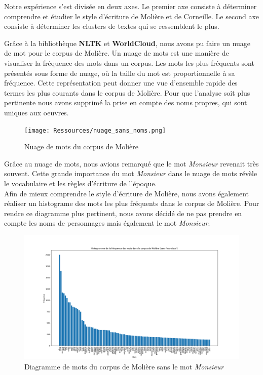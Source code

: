 \vspace{\baselineskip}

\hspace{0,5cm}Notre expérience s'est divisée en deux axes. Le premier axe
consiste à déterminer comprendre et étudier le style d'écriture de Molière et de
Corneille. Le second axe consiste à déterminer les clusters de textes qui se
ressemblent le plus.

\hspace{0,5cm}Grâce à la bibliothèque \textbf{NLTK} et \textbf{WorldCloud}, nous
avons pu faire un nuage de mot pour le corpus de Molière. Un nuage de mots est
une manière de visualiser la fréquence des mots dans un corpus. Les mots les
plus fréquents sont présentés sous forme de nuage, où la taille du mot est
proportionnelle à sa fréquence. Cette représentation peut donner une vue
d'ensemble rapide des termes les plus courants dans le corpus de Molière. Pour
que l'analyse soit plus pertinente nous avons supprimé la prise en compte des
noms propres, qui sont uniques aux oeuvres.

\begin{figure}[htbp]
    \centering
    \texttt{[image: Ressources/nuage\_sans\_noms.png]}
    \caption{Nuage de mots du corpus de Molière}
    \label{fig:images}
  \end{figure}

\vspace{\baselineskip}
\newpage
\hspace{0,5cm}Grâce au nuage de mots, nous avions remarqué que le mot
\textit{Monsieur} revenait très souvent. Cette grande importance du mot
\textit{Monsieur} dans le nuage de mots révèle le vocabulaire et les règles
d'écriture de l'époque.  \\Afin de mieux comprendre le style d'écriture de
Molière, nous avons également réaliser un histograme des mots les plus fréquents
dans le corpus de Molière.  Pour rendre ce diagramme plus pertinent, nous avons
décidé de ne pas prendre en compte les noms de personnages mais également le mot
\textit{Monsieur}.

\begin{figure}[htbp]
    \centering
    \includegraphics[width=13cm]{Ressources/diagr_sans_noms_mosn.png}
\caption{Diagramme de mots du corpus de Molière sans le mot \textit{Monsieur}}
    \label{fig:images}
  \end{figure}

